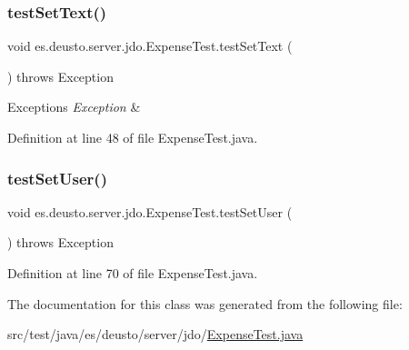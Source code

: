 \subsubsection{\texorpdfstring{test\+Set\+Text()}{testSetText()}}
{\footnotesize\ttfamily void es.\+deusto.\+server.\+jdo.\+Expense\+Test.\+test\+Set\+Text (\begin{DoxyParamCaption}{ }\end{DoxyParamCaption}) throws Exception}


\begin{DoxyExceptions}{Exceptions}
{\em Exception} & \\
\hline
\end{DoxyExceptions}


Definition at line 48 of file Expense\+Test.\+java.

\mbox{\label{classes_1_1deusto_1_1server_1_1jdo_1_1_expense_test_a54d2e8a158f8a3d22df5a68074ce4c1e}} 
\subsubsection{\texorpdfstring{test\+Set\+User()}{testSetUser()}}
{\footnotesize\ttfamily void es.\+deusto.\+server.\+jdo.\+Expense\+Test.\+test\+Set\+User (\begin{DoxyParamCaption}{ }\end{DoxyParamCaption}) throws Exception}



Definition at line 70 of file Expense\+Test.\+java.



The documentation for this class was generated from the following file\+:\begin{DoxyCompactItemize}
\item 
src/test/java/es/deusto/server/jdo/\hyperlink{_expense_test_8java}{Expense\+Test.\+java}\end{DoxyCompactItemize}
